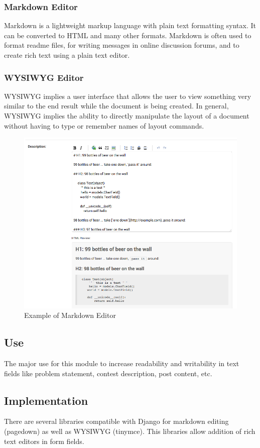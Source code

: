 \subsubsection{Markdown Editor}
Markdown is a lightweight markup language with plain text formatting syntax. It can be converted to HTML and many other formats. Markdown is often used to format readme files, for writing messages in online discussion forums, and to create rich text using a plain text editor.
\subsubsection{WYSIWYG Editor}
WYSIWYG implies a user interface that allows the user to view something very similar to the end result while the document is being created. In general, WYSIWYG implies the ability to directly manipulate the layout of a document without having to type or remember names of layout commands.
\begin{figure}[h!]
    \centering
    \includegraphics[width=\linewidth]{markdown.png}
    \caption{Example of Markdown Editor}
    \label{fig:markdown}
\end{figure}
\subsection{Use}
The major use for this module to increase readability and writability in text fields like problem statement, contest description, post content, etc.
\subsection{Implementation}
There are several libraries compatible with Django for markdown editing (pagedown) as well as WYSIWYG (tinymce). This libraries allow addition of rich text editors in form fields.

